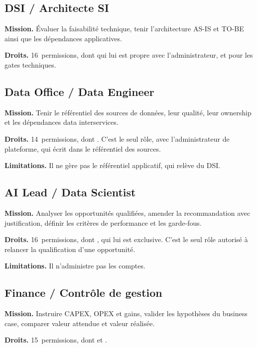 \subsection{DSI / Architecte SI}

\textbf{Mission.} Évaluer la faisabilité technique, tenir l'architecture AS-IS et TO-BE
ainsi que les dépendances applicatives.

\textbf{Droits.} 16~permissions, dont  qui lui est propre avec
l'administrateur, et  pour les gates techniques.

\subsection{Data Office / Data Engineer}

\textbf{Mission.} Tenir le référentiel des sources de données, leur qualité, leur
ownership et les dépendances data interservices.

\textbf{Droits.} 14~permissions, dont . C'est le seul rôle, avec
l'administrateur de plateforme, qui écrit dans le référentiel des sources.

\textbf{Limitations.} Il ne gère pas le référentiel applicatif, qui relève du DSI.

\subsection{AI Lead / Data Scientist}

\textbf{Mission.} Analyser les opportunités qualifiées, amender la recommandation avec
justification, définir les critères de performance et les garde-fous.

\textbf{Droits.} 16~permissions, dont , qui lui est
exclusive. C'est le seul rôle autorisé à relancer la qualification d'une opportunité.

\textbf{Limitations.} Il n'administre pas les comptes.

\subsection{Finance / Contrôle de gestion}

\textbf{Mission.} Instruire CAPEX, OPEX et gains, valider les hypothèses du business
case, comparer valeur attendue et valeur réalisée.

\textbf{Droits.} 15~permissions, dont  et .

